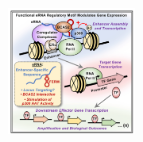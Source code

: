 \begin{figure}
\centering
\includegraphics[width=0.3\textwidth]{../_resources/Screen_Shot_2022-12-20_at_14-17-02.png}
\caption{}
\end{figure}






 


